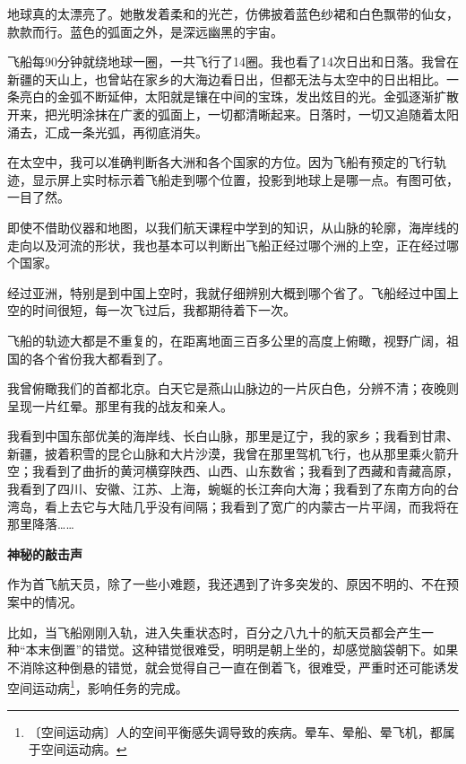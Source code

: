 \documentclass[12pt,UTF-8,openany]{ctexbook}
\begin{document}
\begin{large}
    地球真的太漂亮了。她散发着柔和的光芒，仿佛披着蓝色纱裙和白色飘带的仙女，款款而行。蓝色的弧面之外，是深远幽黑的宇宙。
    
    飞船每90分钟就绕地球一圈，一共飞行了14圈。我也看了14次日出和日落。我曾在新疆的天山上，也曾站在家乡的大海边看日出，但都无法与太空中的日出相比。一条亮白的金弧不断延伸，太阳就是镶在中间的宝珠，发出炫目的光。金弧逐渐扩散开来，把光明涂抹在广袤的弧面上，一切都清晰起来。日落时，一切又追随着太阳涌去，汇成一条光弧，再彻底消失。
    
    在太空中，我可以准确判断各大洲和各个国家的方位。因为飞船有预定的飞行轨迹，显示屏上实时标示着飞船走到哪个位置，投影到地球上是哪一点。有图可依，一目了然。
    
    即使不借助仪器和地图，以我们航天课程中学到的知识，从山脉的轮廓，海岸线的走向以及河流的形状，我也基本可以判断出飞船正经过哪个洲的上空，正在经过哪个国家。
    
    经过亚洲，特别是到中国上空时，我就仔细辨别大概到哪个省了。飞船经过中国上空的时间很短，每一次飞过后，我都期待着下一次。
    
    飞船的轨迹大都是不重复的，在距离地面三百多公里的高度上俯瞰，视野广阔，祖国的各个省份我大都看到了。
    
    我曾俯瞰我们的首都北京。白天它是燕山山脉边的一片灰白色，分辨不清；夜晚则呈现一片红晕。那里有我的战友和亲人。
    
    我看到中国东部优美的海岸线、长白山脉，那里是辽宁，我的家乡；我看到甘肃、新疆，披着积雪的昆仑山脉和大片沙漠，我曾在那里驾机飞行，也从那里乘火箭升空；我看到了曲折的黄河横穿陕西、山西、山东数省；我看到了西藏和青藏高原，我看到了四川、安徽、江苏、上海，蜿蜒的长江奔向大海；我看到了东南方向的台湾岛，看上去它与大陆几乎没有间隔；我看到了宽广的内蒙古一片平阔，而我将在那里降落……
    
    \begin{center}
    
    \begin{large}\textbf{神秘的敲击声}\end{large}
    
    \end{center}
    
    作为首飞航天员，除了一些小难题，我还遇到了许多突发的、原因不明的、不在预案中的情况。
    
    比如，当飞船刚刚入轨，进入失重状态时，百分之八九十的航天员都会产生一种“本末倒置”的错觉。这种错觉很难受，明明是朝上坐的，却感觉脑袋朝下。如果不消除这种倒悬的错觉，就会觉得自己一直在倒着飞，很难受，严重时还可能诱发空间运动病\footnote{〔空间运动病〕人的空间平衡感失调导致的疾病。晕车、晕船、晕飞机，都属于空间运动病。}，影响任务的完成。
    

\end{large}
\end{document}
